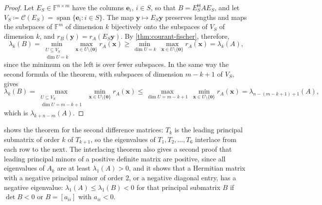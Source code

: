 \begin{proof}
Let $E_S\in\mathbb F^{n\times m}$ have the columns $\mathbf e_i$, $i\in S$, so that $B=E_S^{\mathsf H}AE_S$, and let $V_S\coloneqq\mathcal C(E_S)=\operatorname{span}\{\mathbf e_i:i\in S\}$. The map $\mathbf y\mapsto E_S\mathbf y$ preserves lengths and maps the subspaces of $\mathbb F^m$ of dimension $k$ bijectively onto the subspaces of $V_S$ of dimension $k$, and $r_B(\mathbf y)=r_A(E_S\mathbf y)$. By \cref{thm:courant-fischer}, therefore,
\[
\lambda_k(B)=\min_{\substack{U\subseteq V_S\\\dim U=k}}\ \max_{\mathbf x\in U\setminus\{\mathbf 0\}}r_A(\mathbf x)\ge\min_{\dim U=k}\ \max_{\mathbf x\in U\setminus\{\mathbf 0\}}r_A(\mathbf x)=\lambda_k(A),
\]
since the minimum on the left is over fewer subspaces. In the same way the second formula of the theorem, with subspaces of dimension $m-k+1$ of $V_S$, gives
\[
\lambda_k(B)=\max_{\substack{U\subseteq V_S\\\dim U=m-k+1}}\ \min_{\mathbf x\in U\setminus\{\mathbf 0\}}r_A(\mathbf x)\le\max_{\dim U=m-k+1}\ \min_{\mathbf x\in U\setminus\{\mathbf 0\}}r_A(\mathbf x)=\lambda_{n-(m-k+1)+1}(A),
\]
which is $\lambda_{k+n-m}(A)$.
\end{proof}

 shows the theorem for the second difference matrices: $T_{k}$ is the leading principal submatrix of order $k$ of $T_{k+1}$, so the eigenvalues of $T_1,T_2,\ldots,T_6$ interlace from each row to the next. The interlacing theorem also gives a second proof that leading principal minors of a positive definite matrix are positive, since all eigenvalues of $A_k$ are at least $\lambda_1(A)>0$, and it shows that a Hermitian matrix with a negative principal minor of order $2$, or a negative diagonal entry, has a negative eigenvalue: $\lambda_1(A)\le\lambda_1(B)<0$ for that principal submatrix $B$ if $\det B<0$ or $B=[a_{ii}]$ with $a_{ii}<0$.

